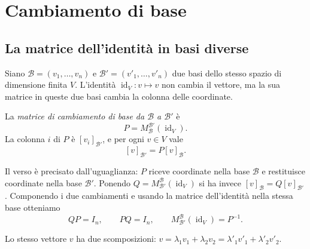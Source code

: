 \section{Cambiamento di base}
\subsection{La matrice dell'identità in basi diverse}
Siano $\mathcal B=(v_1,\ldots,v_n)$ e $\mathcal B'=(v'_1,\ldots,v'_n)$ due basi dello stesso spazio di dimensione finita $V$. L'identità $\operatorname{id}_V:v\mapsto v$ non cambia il vettore, ma la sua matrice in queste due basi cambia la colonna delle coordinate.
\begin{definizione}
La \emph{matrice di cambiamento di base da $\mathcal B$ a $\mathcal B'$} è
\[
 P=M_{\mathcal B}^{\mathcal B'}(\operatorname{id}_V).
\]
La colonna $i$ di $P$ è $[v_i]_{\mathcal B'}$, e per ogni $v\in V$ vale
\[
 [v]_{\mathcal B'}=P[v]_{\mathcal B}.
\]
\end{definizione}
Il verso è precisato dall'uguaglianza: $P$ riceve coordinate nella base $\mathcal B$ e restituisce coordinate nella base $\mathcal B'$. Ponendo $Q=M_{\mathcal B'}^{\mathcal B}(\operatorname{id}_V)$ si ha invece $[v]_{\mathcal B}=Q[v]_{\mathcal B'}$. Componendo i due cambiamenti e usando la matrice dell'identità nella stessa base otteniamo
\[
 QP=I_n,\qquad PQ=I_n,\qquad
 M_{\mathcal B'}^{\mathcal B}(\operatorname{id}_V)=P^{-1}.
\]

\begin{schema}

Lo stesso vettore $v$ ha due scomposizioni: $v=\lambda_1v_1+\lambda_2v_2=\lambda'_1v'_1+\lambda'_2v'_2$.
\end{schema}

